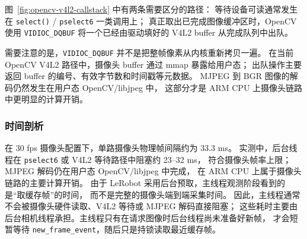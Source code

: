 图~\ref{fig:opencv-v4l2-callstack} 中有两条需要区分的路径：
等待设备可读通常发生在 \texttt{select()} / \texttt{pselect6} 一类调用上；
真正取出已完成图像缓冲区时，OpenCV 使用 \texttt{VIDIOC\_DQBUF} 将一个已经由驱动填好的
V4L2 buffer 从完成队列中出队。

需要注意的是，\texttt{VIDIOC\_DQBUF} 并不是把整帧像素从内核重新拷贝一遍。
在当前 OpenCV V4L2 路径中，摄像头 buffer 通过 mmap 暴露给用户态；
出队操作主要返回 buffer 的编号、有效字节数和时间戳等元数据。
MJPEG 到 BGR 图像的解码仍然发生在用户态 OpenCV/libjpeg 中，
这部分才是 ARM CPU 上摄像头链路中更明显的计算开销。

\subsubsection{时间剖析}

在 30 fps 摄像头配置下，单路摄像头物理帧间隔约为 33.3 ms。
实测中，后台线程在 \texttt{pselect6} 或 V4L2 等待路径中阻塞约 23--32 ms，
符合摄像头帧率上限；MJPEG 解码仍在用户态 OpenCV/libjpeg 中完成，
在 ARM CPU 上属于摄像头链路的主要计算开销。
由于 LeRobot 采用后台预取，主线程观测阶段看到的是“取缓存帧”的时间，
而不是完整的摄像头端到端采集时间。
因此，主线程通常不会被摄像头硬件读取、V4L2 等待或 MJPEG 解码直接阻塞；
这些耗时主要由后台相机线程承担。主线程只有在请求图像时后台线程尚未准备好新帧，
才会短暂等待 \texttt{new\_frame\_event}，随后只是持锁读取最近缓存帧。
